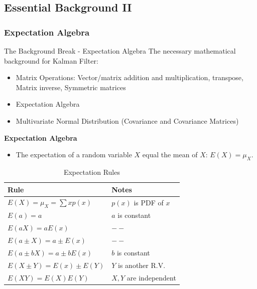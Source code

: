 \subsection{Essential Background II}
\subsubsection{Expectation Algebra}
\begin{frame}{The Background Break - Expectation Algebra}
        The necessary mathematical background for Kalman Filter:
            \begin{itemize}
                \item Matrix Operations: Vector/matrix addition and multiplication, transpose, Matrix inverse, Symmetric matrices
                \item Expectation Algebra
                \item Multivariate Normal Distribution (Covariance and Covariance Matrices)
            \end{itemize}
        \textbf{Expectation Algebra}
        \begin{itemize}
            \item The expectation of a random variable $X$ equal the mean of $X$: $E(X)=\mu_X$.
        \end{itemize}
         \begin{table}[]
            \centering
            \begin{tabular}{ll}
                \toprule
                \textbf{Rule} & \textbf{Notes} \\
                \toprule
                $E(X) = \mu_X = \sum x p(x)$ & $p(x)$ is PDF of $x$ \\
                $E(a) = a$ & $a$ is constant\\
                $E(aX) = aE(x)$ & $--$\\
                $E(a\pm X) = a\pm E(x)$ & $--$\\
                $E(a\pm bX) = a\pm bE(x)$ & $b$ is constant\\
                $E(X\pm Y) = E(x) \pm E(Y)$ & $Y$ is another R.V.\\
                $E(XY) = E(X)E(Y)$ & $X, Y$ are independent\\
                \bottomrule
            \end{tabular}
            \caption{Expectation Rules}
            \label{tab:ExpectationRules}
        \end{table}
\end{frame}

